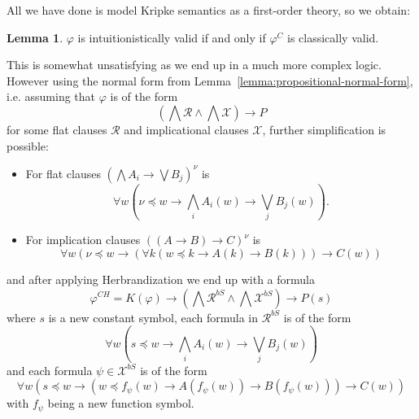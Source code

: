 \documentclass{easychair}
\theoremstyle{definition}
\theoremstyle{definition}
\theoremstyle{definition}
\newtheorem{lemma}[theorem]{Lemma}
\theoremstyle{definition}
\theoremstyle{definition}
\theoremstyle{definition}
\theoremstyle{definition}
\begin{document}
\noindent All we have done is model Kripke semantics as a first-order theory, so we obtain:

\begin{lemma}
	$\varphi$ is intuitionistically valid if and only if $\varphi^C$ is classically valid.
\end{lemma}

This is somewhat unsatisfying as we end up in a much more complex logic. However using the normal form from Lemma~\ref{lemma:propositional-normal-form}, i.e. assuming that $\varphi$ is of the form $$\left(\bigwedge\mathcal R\wedge\bigwedge\mathcal X\right)\to P$$ for some flat clauses $\mathcal R$ and implicational clauses $\mathcal X$, further simplification is possible:
\begin{itemize}
	\item For flat clauses $(\bigwedge A_i\to\bigvee B_j)^\nu$ is
	$$\forall w\left(\nu\preceq w\to\bigwedge_i A_i(w)\to\bigvee_jB_j(w)\right).$$
	\item For implication clauses $((A\to B)\to C)^\nu$ is
	$$\forall w(\nu\preceq w\to(\forall k(w\preceq k\to A(k)\to B(k)))\to C(w))$$
\end{itemize}

and after applying Herbrandization we end up with a formula $$\varphi^{CH} = K(\varphi)\to\left(\bigwedge\mathcal R^{b S}\wedge \bigwedge\mathcal X^{b S}\right)\to P(s)$$ where $s$ is a new constant symbol, each formula in $\mathcal R^{b S}$ is of the form
$$\forall w\left(s\preceq w\to\bigwedge_iA_i(w)\to\bigvee_jB_j(w)\right)$$
and each formula $\psi\in\mathcal X^{b S}$ is of the form
$$\forall w(s\preceq w\to(w\preceq f_\psi(w)\to A(f_\psi(w))\to B(f_\psi(w)))\to C(w))$$
with $f_\psi$ being a new function symbol.
\end{document}
